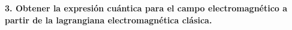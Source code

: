 \textbf{3. Obtener la expresión cuántica para el campo electromagnético a partir de la lagrangiana
electromagnética clásica.}\\